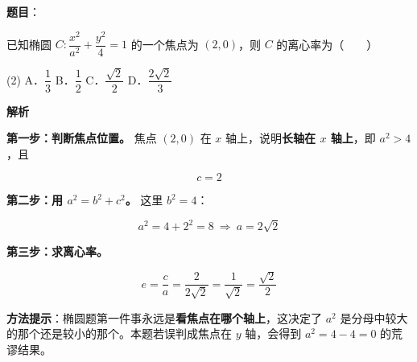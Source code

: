 \begin{answer}

\textbf{题目}：

已知椭圆 $C:\dfrac{x^{2}}{a^{2}}+\dfrac{y^{2}}4=1$ 的一个焦点为 $(2,0)$，则 $C$ 的离心率为\mbox{（　　）}

\begin{gkopts}(2)
\task A．$\dfrac13$
\task B．$\dfrac12$
\task C．$\dfrac{\sqrt2}2$
\task D．$\dfrac{2\sqrt2}3$
\end{gkopts}

\textbf{解析}

\textbf{第一步：判断焦点位置。} 焦点 $(2,0)$ 在 $x$ 轴上，说明\textbf{长轴在 $x$ 轴上}，即 $a^{2}>4$，且

\nopagebreak[4]
\[c=2\]

\textbf{第二步：用 $a^{2}=b^{2}+c^{2}$。} 这里 $b^{2}=4$：

\nopagebreak[4]
\[a^{2}=4+2^{2}=8\ \Longrightarrow\ a=2\sqrt2\]

\textbf{第三步：求离心率。}

\nopagebreak[4]
\[e=\frac ca=\frac2{2\sqrt2}=\frac1{\sqrt2}=\frac{\sqrt2}2\]

\begin{gktip}
\textbf{方法提示}：椭圆题第一件事永远是\textbf{看焦点在哪个轴上}，这决定了 $a^{2}$ 是分母中较大的那个还是较小的那个。本题若误判成焦点在 $y$ 轴，会得到 $a^{2}=4-4=0$ 的荒谬结果。
\end{gktip}


\par\medskip

\end{answer}

